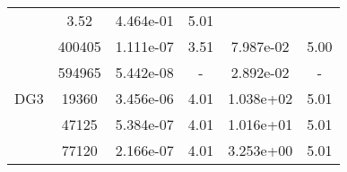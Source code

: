 \begin{table}
\begin{center}
{\begin{tabular}{| l | c | c | c | c | c |}
                &3.52
                
                &4.464e-01
                
                &5.01\\
                
            &400405
            
                &1.111e-07
                
                &3.51
                
                &7.987e-02
                
                &5.00\\
                
            &594965
            
                &5.442e-08
                
                &-
                
                &2.892e-02
                
                &-\\
                \hline
        \hline
        \hspace{0.1cm}DG3\hspace{0.1cm}    
        
            &19360
            
                &3.456e-06
                
                &4.01
                
                &1.038e+02
                
                &5.01\\
                
            &47125
            
                &5.384e-07
                
                &4.01
                
                &1.016e+01
                
                &5.01\\
                
            &77120
            
                &2.166e-07
                
                &4.01
                
                &3.253e+00
                
                &5.01\\
                

\end{tabular}}
\end{center}
\end{table}
